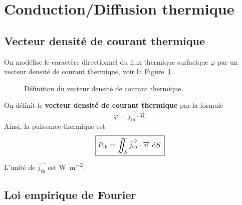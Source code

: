 \section{Conduction/Diffusion thermique}

    \subsection{Vecteur densité de courant thermique}

        On modélise le caractère directionnel du flux thermique surfacique $\varphi$ par un vecteur densité de courant thermique, voir la Figure~\ref{fig:vecteur_densite_courant_thermique}.

        \begin{figure}
            \centering
            \caption{Définition du vecteur densité de courant thermique.}    
            \label{fig:vecteur_densite_courant_thermique}
        \end{figure}

        \begin{definition}
            On définit le \textbf{vecteur densité de courant thermique} par la formule
            \begin{equation}
                \varphi=\vec{j_{\text{th}}}\cdot\vec{n}.
            \end{equation}
            Ainsi, la puissance thermique est
            \begin{equation}
                \boxed{
                    P_{\text{th}}=\iint_{S}\protect\overrightarrow{{j_{\text{th}}}}\cdot\protect\overrightarrow{{n}}~\mathrm{d} S.
                }
            \end{equation}
            L'unité de $\vec{j_{\text{th}}}$ est \si{\watt\per\metre\squared}.
        \end{definition}

    \subsection{Loi empirique de Fourier}

